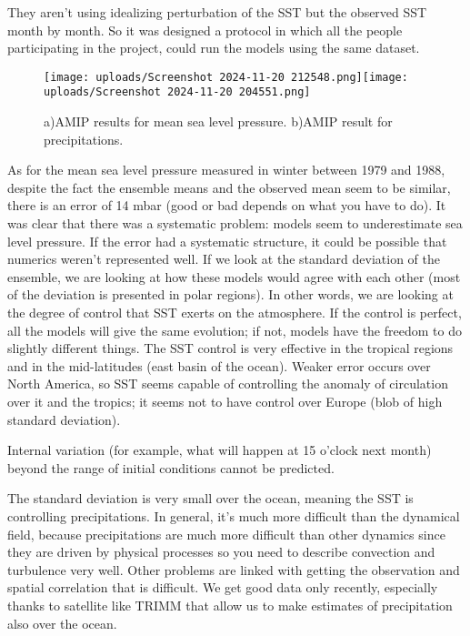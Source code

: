 They aren't using idealizing perturbation of the SST but the observed SST month by month. So it was designed a protocol in which all the people participating in the project, could run the models using the same dataset.
\begin{figure}[htp!]
	\centering
	\texttt{[image: uploads/Screenshot 2024-11-20 212548.png]}\quad \texttt{[image: uploads/Screenshot 2024-11-20 204551.png]}
	\caption{a)AMIP results for mean sea level pressure. b)AMIP result for precipitations.}

\end{figure}
As for the mean sea level pressure measured in winter between 1979 and 1988, despite the fact the ensemble means and the observed mean seem to be similar, there is an error of 14 mbar (good or bad depends on what you have to do).
It was clear that there was a systematic problem: models seem to underestimate sea level pressure. If the error had a systematic structure, it could be possible that numerics weren't represented well.
If we look at the standard deviation of the ensemble, we are looking at how these models would agree with each other (most of the deviation is presented in polar regions). In other words, we are looking at the degree of control that SST exerts on the atmosphere. If the control is perfect, all the models will give the same evolution; if not, models have the freedom to do slightly different things.
The SST control is very effective in the tropical regions and in the mid-latitudes (east basin of the ocean). Weaker error occurs over North America, so SST seems capable of controlling the anomaly of circulation over it and the tropics; it seems not to have control over Europe (blob of high standard deviation).

Internal variation (for example, what will happen at 15 o'clock next month) beyond the range of initial conditions cannot be predicted.



The standard deviation is very small over the ocean, meaning the SST is controlling precipitations.
In general, it's much more difficult than the dynamical field, because precipitations are much more difficult than other dynamics since they are driven by physical processes so you need to describe convection and turbulence very well. Other problems are linked with getting the observation and spatial correlation that is difficult. We get good data only recently, especially thanks to satellite like TRIMM that allow us to make estimates of precipitation also over the ocean.


